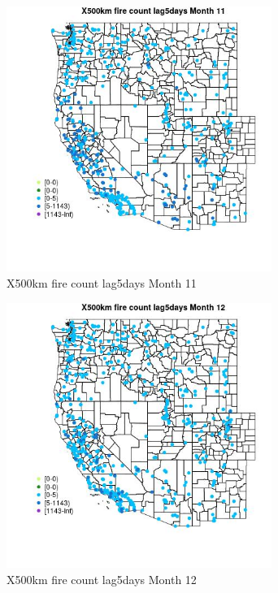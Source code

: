 \begin{figure} 
\centering  
\includegraphics[width=0.77\textwidth]{Code_Outputs/Report_ML_input_PM25_Step4_part_e_de_duplicated_aves_compiled_2019-05-14wNAs_MapObsMo11X500km_fire_count_lag5days.jpg} 
\caption{\label{fig:Report_ML_input_PM25_Step4_part_e_de_duplicated_aves_compiled_2019-05-14wNAsMapObsMo11X500km_fire_count_lag5days}X500km fire count lag5days Month 11} 
\end{figure} 
 

\begin{figure} 
\centering  
\includegraphics[width=0.77\textwidth]{Code_Outputs/Report_ML_input_PM25_Step4_part_e_de_duplicated_aves_compiled_2019-05-14wNAs_MapObsMo12X500km_fire_count_lag5days.jpg} 
\caption{\label{fig:Report_ML_input_PM25_Step4_part_e_de_duplicated_aves_compiled_2019-05-14wNAsMapObsMo12X500km_fire_count_lag5days}X500km fire count lag5days Month 12} 
\end{figure} 
 

